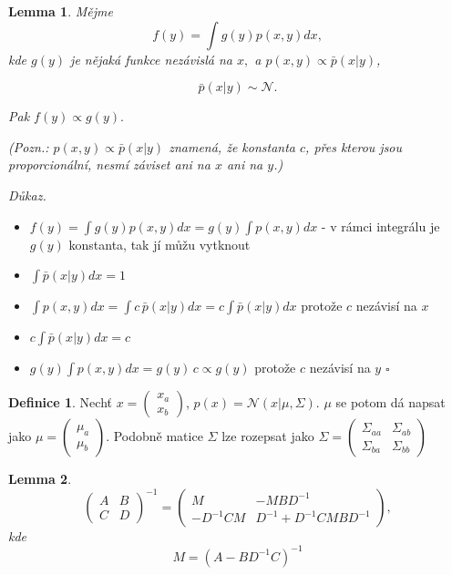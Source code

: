 \documentclass{article}
\newenvironment{pitemize}{
\begin{itemize}
  \setlength{\itemsep}{5pt}
  \setlength{\parskip}{0pt}
  \setlength{\parsep}{0pt}
}{\end{itemize}}
\newenvironment{pproof}{
\noindent\emph{Důkaz.}
\begin{pitemize}
}{\hfill$\square$\end{pitemize}}
\newcommand{\NN}{\mathcal{N}}
\newtheorem{lemma}{Lemma}
\theoremstyle{definition}
\newtheorem{definice}{Definice}
\begin{document}

\begin{lemma}%
\label{polomarginal}
Mějme $$f(y)=\int g(y) p(x,y) dx,$$ kde $g(y)$ je nějaká funkce nezávislá na $x,$ a $p(x,y)\propto\bar{p}(x|y)$, 

$$\bar{p}(x|y)\sim\NN.$$

Pak $f(y) \propto g(y).$

(Pozn.: $p(x,y)\propto\bar{p}(x|y)$ znamená, že konstanta $c$, přes kterou jsou proporcionální, nesmí záviset ani na $x$ ani na $y$.)

\end{lemma}
\begin{pproof}
\item $f(y)=\int g(y) p(x,y) dx=g(y) \int  p(x,y) dx$ - v rámci integrálu je $g(y)$ konstanta, tak jí můžu vytknout 
\item $\int \bar{p}(x|y) dx=1$ 
\item $\int p(x,y) dx=\int c \,\bar{p}(x|y) dx=c\int \bar{p}(x|y) dx$ protože $c$ nezávisí na $x$
\item $c\int \bar{p}(x|y) dx=c$

\item $g(y) \int  p(x,y) dx=g(y)\,c\propto g(y)$ protože $c$ nezávisí na $y$
\end{pproof}

\begin{definice}
Nechť $x=\left(\begin{matrix}x_a\\x_b \end{matrix}\right)$, $p(x)=\NN(x|\mu,\Sigma)$. $\mu$ se potom dá napsat jako $\mu=\left(\begin{matrix}\mu_a\\\mu_b \end{matrix}\right)$. Podobně matice $\Sigma$ lze rozepsat jako $\Sigma = \left(\begin{matrix}\Sigma_{aa}&\Sigma_{ab}\\\Sigma_{ba}&\Sigma_{bb} \end{matrix}\right)$
\end{definice}

\begin{lemma}
\label{inverze}
$$ \left(\begin{matrix}A&B\\C&D \end{matrix}\right)^{-1}=\left(\begin{matrix}M&-MBD^{-1}\\-D^{-1}CM&D^{-1}+D^{-1}CMBD^{-1} \end{matrix}\right),$$ kde $$M=\left(A-BD^{-1}C\right)^{-1}$$
\end{lemma}
\end{document}
